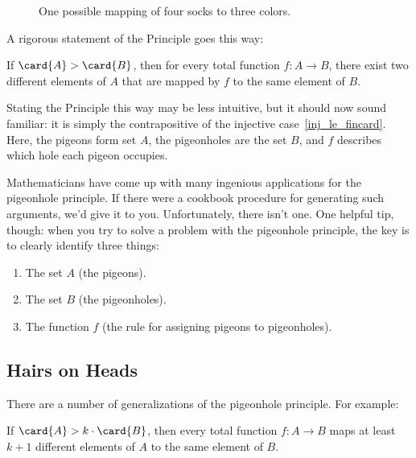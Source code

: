 \begin{figure}


\caption{One possible mapping of four socks to three colors.}

\label{fig:11P1}

\end{figure}

A rigorous statement of the Principle goes this way:
\begin{rul}
  If $\card{A} > \card{B}$, then for every total function $f : A \to
  B$, there exist two different elements of $A$ that are mapped by $f$
  to the same element of $B$.
\end{rul}
Stating the Principle this way may be less intuitive, but it should
now sound familiar: it is simply the contrapositive of the
 injective case~\eqref{inj_le_fincard}.  Here, the
pigeons form set $A$, the pigeonholes are the set $B$, and $f$
describes which hole each pigeon occupies.

Mathematicians have come up with many ingenious applications for the
pigeonhole principle.  If there were a cookbook procedure for
generating such arguments, we'd give it to you.  Unfortunately, there
isn't one.  One helpful tip, though: when you try to solve a problem
with the pigeonhole principle, the key is to clearly identify three
things:

\begin{enumerate}

\item The set $A$ (the pigeons).

\item The set $B$ (the pigeonholes).

\item The function $f$ (the rule for assigning pigeons to pigeonholes).

\end{enumerate}


\subsection{Hairs on Heads}

There are a number of generalizations of the pigeonhole principle.
For example:
\begin{rul}
  If $\card{A} > k \cdot \card{B}$, then every total function $f : A \to
  B$ maps at least $k+1$ different elements of $A$ to the same element of
  $B$.
\end{rul}

